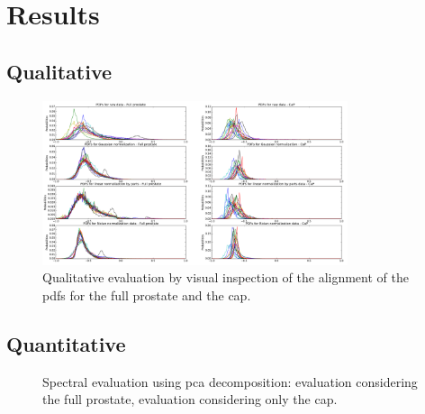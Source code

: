 \graphicspath{ {./content/results/figures/} }

\section{Results}
\label{sec:res}

\subsection{Qualitative}

\begin{figure}
  \centering
  \includegraphics[width=0.8\textwidth]{qualitative.png}
  \caption{Qualitative evaluation by visual inspection of the alignment of the \ac{pdf}s for the full prostate and the \ac{cap}.}
  \label{fig:qu}
\end{figure}

\subsection{Quantitative}

\begin{figure}
  \centering
  \hfill
  \caption{Spectral evaluation using \ac{pca} decomposition: \protect{} evaluation considering the full prostate, \protect{} evaluation considering only the \ac{cap}.}
  \label{fig:qt}
\end{figure}

